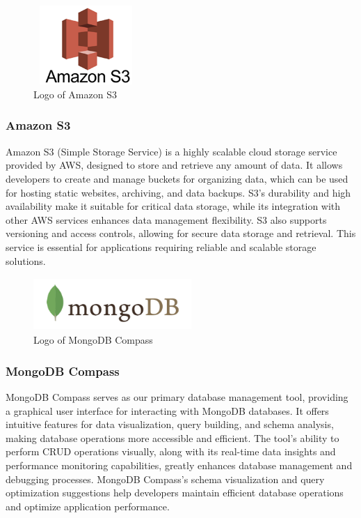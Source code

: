 \documentclass[conference]{IEEEtran}
\begin{document}
        \begin{figure}[htbp]
            \centerline{\includegraphics[width=4cm, height=3cm]{Images/logo/awss3.png}}
            \caption{Logo of Amazon S3}
            \label{fig}
        \end{figure}
        \subsubsection{Amazon S3}
            Amazon S3 (Simple Storage Service) is a highly scalable cloud storage service provided by AWS, designed to store and retrieve any amount of data. It allows developers to create and manage buckets for organizing data, which can be used for hosting static websites, archiving, and data backups. S3's durability and high availability make it suitable for critical data storage, while its integration with other AWS services enhances data management flexibility. S3 also supports versioning and access controls, allowing for secure data storage and retrieval. This service is essential for applications requiring reliable and scalable storage solutions.

        \begin{figure}[htbp]
            \centerline{\includegraphics[width=6cm, height=2cm]{Images/logo/compass.png}}
            \caption{Logo of MongoDB Compass}
            \label{fig}
        \end{figure}
        \subsubsection{MongoDB Compass}
            MongoDB Compass serves as our primary database management tool, providing a graphical user interface for interacting with MongoDB databases. It offers intuitive features for data visualization, query building, and schema analysis, making database operations more accessible and efficient. The tool's ability to perform CRUD operations visually, along with its real-time data insights and performance monitoring capabilities, greatly enhances database management and debugging processes. MongoDB Compass's schema visualization and query optimization suggestions help developers maintain efficient database operations and optimize application performance.
\end{document}
